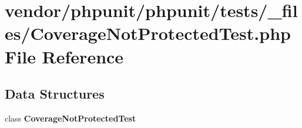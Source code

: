 \section{vendor/phpunit/phpunit/tests/\+\_\+files/\+Coverage\+Not\+Protected\+Test.php File Reference}
\label{phpunit_2tests_2__files_2_coverage_not_protected_test_8php}
\subsection*{Data Structures}
\begin{DoxyCompactItemize}
\item 
class {\bf Coverage\+Not\+Protected\+Test}
\end{DoxyCompactItemize}
